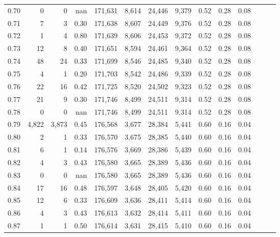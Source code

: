 \begin{tabular}{rrrrrrrrrrrrrr}
0.70 &       0 &      0 &   nan &  171,631 &    8,614 &  24,446 &   9,379 &  0.52 &  0.28 &      0.08 \\
0.71 &       7 &      3 &  0.30 &  171,638 &    8,607 &  24,449 &   9,376 &  0.52 &  0.28 &      0.08 \\
0.72 &       1 &      4 &  0.80 &  171,639 &    8,606 &  24,453 &   9,372 &  0.52 &  0.28 &      0.08 \\
0.73 &      12 &      8 &  0.40 &  171,651 &    8,594 &  24,461 &   9,364 &  0.52 &  0.28 &      0.08 \\
0.74 &      48 &     24 &  0.33 &  171,699 &    8,546 &  24,485 &   9,340 &  0.52 &  0.28 &      0.08 \\
0.75 &       4 &      1 &  0.20 &  171,703 &    8,542 &  24,486 &   9,339 &  0.52 &  0.28 &      0.08 \\
0.76 &      22 &     16 &  0.42 &  171,725 &    8,520 &  24,502 &   9,323 &  0.52 &  0.28 &      0.08 \\
0.77 &      21 &      9 &  0.30 &  171,746 &    8,499 &  24,511 &   9,314 &  0.52 &  0.28 &      0.08 \\
0.78 &       0 &      0 &   nan &  171,746 &    8,499 &  24,511 &   9,314 &  0.52 &  0.28 &      0.08 \\
0.79 &   4,822 &  3,873 &  0.45 &  176,568 &    3,677 &  28,384 &   5,441 &  0.60 &  0.16 &      0.04 \\
0.80 &       2 &      1 &  0.33 &  176,570 &    3,675 &  28,385 &   5,440 &  0.60 &  0.16 &      0.04 \\
0.81 &       6 &      1 &  0.14 &  176,576 &    3,669 &  28,386 &   5,439 &  0.60 &  0.16 &      0.04 \\
0.82 &       4 &      3 &  0.43 &  176,580 &    3,665 &  28,389 &   5,436 &  0.60 &  0.16 &      0.04 \\
0.83 &       0 &      0 &   nan &  176,580 &    3,665 &  28,389 &   5,436 &  0.60 &  0.16 &      0.04 \\
0.84 &      17 &     16 &  0.48 &  176,597 &    3,648 &  28,405 &   5,420 &  0.60 &  0.16 &      0.04 \\
0.85 &      12 &      6 &  0.33 &  176,609 &    3,636 &  28,411 &   5,414 &  0.60 &  0.16 &      0.04 \\
0.86 &       4 &      3 &  0.43 &  176,613 &    3,632 &  28,414 &   5,411 &  0.60 &  0.16 &      0.04 \\
0.87 &       1 &      1 &  0.50 &  176,614 &    3,631 &  28,415 &   5,410 &  0.60 &  0.16 &      0.04 \\

\end{tabular}
